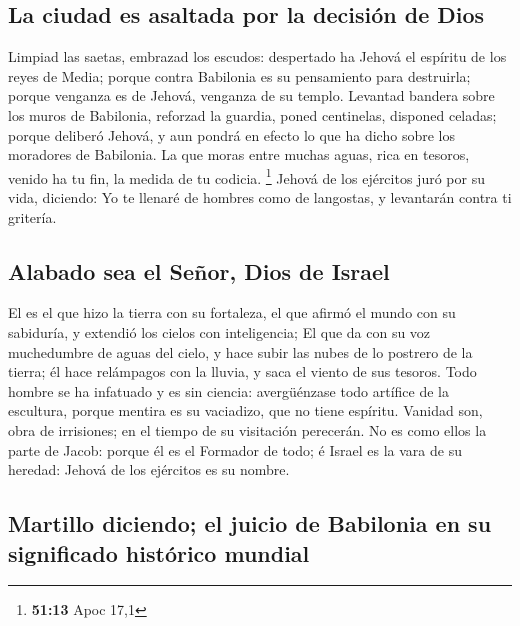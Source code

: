 \hypertarget{la-ciudad-es-asaltada-por-la-decisiuxf3n-de-dios}{%
\subsection{La ciudad es asaltada por la decisión de
Dios}\label{la-ciudad-es-asaltada-por-la-decisiuxf3n-de-dios}}

 Limpiad las saetas, embrazad los escudos: despertado ha
Jehová el espíritu de los reyes de Media; porque contra Babilonia es su
pensamiento para destruirla; porque venganza es de Jehová, venganza de
su templo.  Levantad bandera sobre los muros de
Babilonia, reforzad la guardia, poned centinelas, disponed celadas;
porque deliberó Jehová, y aun pondrá en efecto lo que ha dicho sobre los
moradores de Babilonia.  La que moras entre muchas aguas,
rica en tesoros, venido ha tu fin, la medida de tu codicia. \footnote{\textbf{51:13}
  Apoc 17,1}  Jehová de los ejércitos juró por su vida,
diciendo: Yo te llenaré de hombres como de langostas, y levantarán
contra ti gritería.

\hypertarget{alabado-sea-el-seuxf1or-dios-de-israel}{%
\subsection{Alabado sea el Señor, Dios de
Israel}\label{alabado-sea-el-seuxf1or-dios-de-israel}}

 El es el que hizo la tierra con su fortaleza, el que
afirmó el mundo con su sabiduría, y extendió los cielos con
inteligencia;  El que da con su voz muchedumbre de aguas
del cielo, y hace subir las nubes de lo postrero de la tierra; él hace
relámpagos con la lluvia, y saca el viento de sus tesoros.
 Todo hombre se ha infatuado y es sin ciencia:
avergüénzase todo artífice de la escultura, porque mentira es su
vaciadizo, que no tiene espíritu.  Vanidad son, obra de
irrisiones; en el tiempo de su visitación perecerán.  No
es como ellos la parte de Jacob: porque él es el Formador de todo; é
Israel es la vara de su heredad: Jehová de los ejércitos es su nombre.

\hypertarget{martillo-diciendo-el-juicio-de-babilonia-en-su-significado-histuxf3rico-mundial}{%
\subsection{Martillo diciendo; el juicio de Babilonia en su significado
histórico
mundial}\label{martillo-diciendo-el-juicio-de-babilonia-en-su-significado-histuxf3rico-mundial}}

